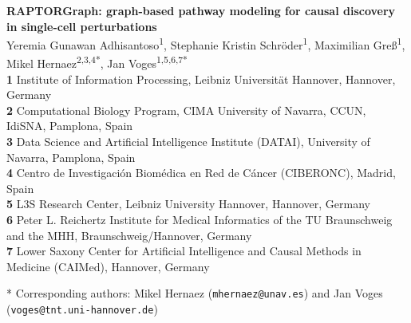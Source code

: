\documentclass[10pt,letterpaper]{article}
\theoremstyle{definition}
\theoremstyle{remark}
\begin{document}
\vspace*{0.2in}

\begin{flushleft}
{\Large
\textbf{RAPTORGraph: graph-based pathway modeling for causal discovery in single-cell perturbations} %
}
\newline
\\
Yeremia Gunawan Adhisantoso\textsuperscript{1},
Stephanie Kristin Schr\"oder\textsuperscript{1},
Maximilian Gre\ss\textsuperscript{1},
Mikel Hernaez\textsuperscript{2,3,4*},
Jan Voges\textsuperscript{1,5,6,7*}
\\
\bigskip
\textbf{1} Institute of Information Processing, Leibniz Universit\"at Hannover, Hannover, Germany
\\
\textbf{2} Computational Biology Program, CIMA University of Navarra, CCUN, IdiSNA, Pamplona, Spain
\\
\textbf{3} Data Science and Artificial Intelligence Institute (DATAI), University of Navarra, Pamplona, Spain
\\
\textbf{4} Centro de Investigaci\'on Biom\'edica en Red de C\'ancer (CIBERONC), Madrid, Spain
\\
\textbf{5} L3S Research Center, Leibniz University Hannover, Hannover, Germany
\\
\textbf{6} Peter L. Reichertz Institute for Medical Informatics of the TU Braunschweig and the MHH, Braunschweig/Hannover, Germany
\\
\textbf{7} Lower Saxony Center for Artificial Intelligence and Causal Methods in Medicine (CAIMed), Hannover, Germany
\\
\bigskip

* Corresponding authors: Mikel Hernaez (\texttt{mhernaez@unav.es}) and Jan Voges (\texttt{voges@tnt.uni-hannover.de})

\end{flushleft}

\end{document}

